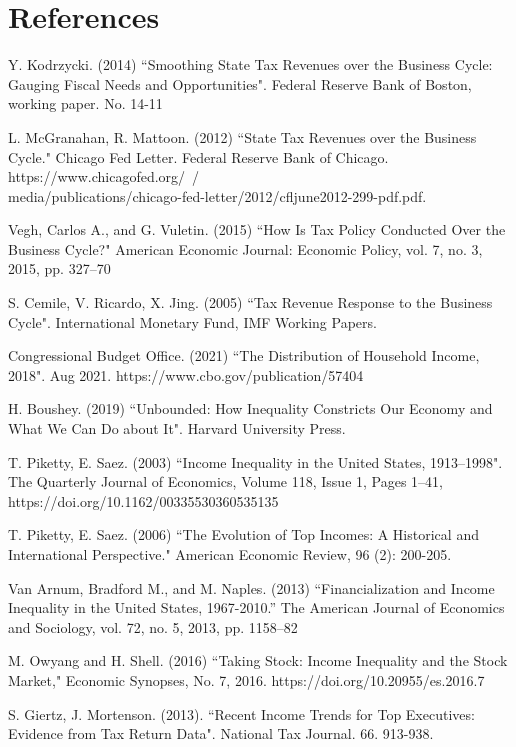 \documentclass{article}
\begin{document}
\pagebreak
\section*{References}
\begin{hangparas}{.25in}{1}


Y. Kodrzycki. (2014) ``Smoothing State Tax Revenues over the Business Cycle: Gauging Fiscal Needs and Opportunities". Federal Reserve Bank of Boston, working paper. No. 14-11

L. McGranahan, R. Mattoon. (2012) ``State Tax Revenues over the Business Cycle." Chicago Fed Letter. Federal Reserve Bank of Chicago. https://www.chicagofed.org/~/\\
media/publications/chicago-fed-letter/2012/cfljune2012-299-pdf.pdf.

Vegh, Carlos A., and G. Vuletin. (2015) ``How Is Tax Policy Conducted Over the Business Cycle?" American Economic Journal: Economic Policy, vol. 7, no. 3, 2015, pp. 327–70

S. Cemile, V. Ricardo, X. Jing. (2005) ``Tax Revenue Response to the Business Cycle". International Monetary Fund, IMF Working Papers.

Congressional Budget Office. (2021) ``The Distribution of Household Income, 2018". Aug 2021. https://www.cbo.gov/publication/57404

H. Boushey. (2019) ``Unbounded: How Inequality Constricts Our Economy and What We Can Do about It". Harvard University Press.

T. Piketty, E. Saez. (2003) ``Income Inequality in the United States, 1913–1998". The Quarterly Journal of Economics, Volume 118, Issue 1, Pages 1–41, https://doi.org/10.1162/00335530360535135

T. Piketty, E. Saez. (2006) ``The Evolution of Top Incomes: A Historical and International Perspective." American Economic Review, 96 (2): 200-205.

Van Arnum, Bradford M., and M. Naples. (2013) ``Financialization and Income Inequality in the United States, 1967-2010.” The American Journal of Economics and Sociology, vol. 72, no. 5, 2013, pp. 1158–82

M. Owyang and H. Shell. (2016) ``Taking Stock: Income Inequality and the Stock Market," Economic Synopses, No. 7, 2016. https://doi.org/10.20955/es.2016.7

S. Giertz,  J. Mortenson. (2013). ``Recent Income Trends for Top Executives: Evidence from Tax Return Data". National Tax Journal. 66. 913-938.

\end{hangparas}
\end{document}
